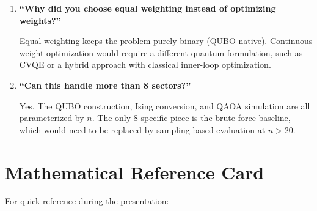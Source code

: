 \documentclass[12pt, a4paper]{article}
\begin{document}
\begin{enumerate}
    The MDS layout places correlated sectors nearby. On a real neutral-atom
    device, atoms that need strong ZZ interactions should be physically close
    (interaction strength decays with distance). Our layout provides a starting
    point for mapping the problem onto hardware.

    \item \textbf{``Why did you choose equal weighting instead of optimizing weights?''}

    Equal weighting keeps the problem purely binary (QUBO-native). Continuous
    weight optimization would require a different quantum formulation, such as
    CVQE or a hybrid approach with classical inner-loop optimization.

    \item \textbf{``Can this handle more than 8 sectors?''}

    Yes. The QUBO construction, Ising conversion, and QAOA simulation are all
    parameterized by $n$. The only 8-specific piece is the brute-force baseline,
    which would need to be replaced by sampling-based evaluation at $n > 20$.
\end{enumerate}


\section{Mathematical Reference Card}

For quick reference during the presentation:
\end{document}
